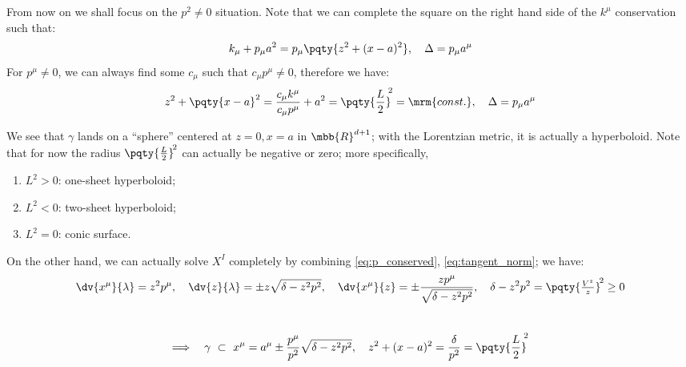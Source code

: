 \documentclass[a4paper,10pt]{article}
\begin{document}
	From now on we shall focus on the $p^2 \ne 0$ situation. Note that we can complete the square on the right hand side of the $k^\mu$ conservation such that:
	\begin{equation}
		k_\mu + p_\mu a^2
		= p_\mu \pqty{
			z^2 + (x - a)^2
		},
	\quad \Delta = p_\mu a^\mu
	\end{equation}
	For $p^\mu \ne 0$, we can always find some $c_\mu$ such that $c_\mu p^\mu \ne 0$, therefore we have:
	\begin{equation}
		z^2 + \pqty{x - a}^2
		= \frac{c_\mu k^\mu}{c_\mu p^\mu}
			+ a^2
		= \pqty{\frac{L}{2}}^{\!\!2}
		= \mrm{const.},
	\quad \Delta = p_\mu a^\mu
	\end{equation}
	
	We see that $\gamma$ lands on a ``sphere'' centered at $z = 0, x = a$ in $\mbb{R}^{d+1}$; with the Lorentzian metric, it is actually a hyperboloid. Note that for now the radius $\pqty{\frac{L}{2}}^{\!2}$ can actually be negative or zero; more specifically,
	\begin{enumerate}[noitemsep]
	\item $L^2 > 0$: one-sheet hyperboloid;
	\item $L^2 < 0$: two-sheet hyperboloid;
	\item $L^2 = 0$: conic surface. 
	\end{enumerate}
	On the other hand, we can actually solve $X^I$ completely by combining \eqref{eq:p_conserved}, \eqref{eq:tangent_norm}; we have:
	\begin{equation}
		\dv{x^\mu}{\lambda} = z^2 p^\mu,
	\quad
		\dv{z}{\lambda}
		= \pm z\sqrt{\delta - z^2 p^2},
	\quad
		\dv{x^\mu}{z}
		= \pm \frac{zp^\mu}{\sqrt{\delta - z^2 p^2}},
	\quad
		\delta - z^2 p^2
		= \pqty{\tfrac{V^z}{z}}^{\!2} \ge 0
	\end{equation}
	\\[-1.5\baselineskip]
	\begin{equation}
	\Longrightarrow\quad
		\gamma \ \subset\ %
		x^\mu
		= a^\mu \pm\frac{p^\mu}{p^2}
			\sqrt{\delta - z^2 p^2},
	\quad
		z^2 + (x - a)^2
		= \frac{\delta}{p^2}
		= \pqty{\frac{L}{2}}^{\!\!2}
	\label{eq:unified_geodesic}
	\end{equation}
	
\end{document}

